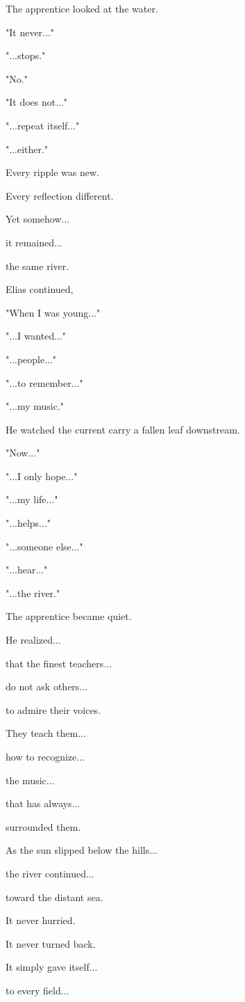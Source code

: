 \documentclass[12pt,openany]{book}
\begin{document}
The apprentice looked at the water.

"It never..."

"...stops."

"No."

"It does not..."

"...repeat itself..."

"...either."

Every ripple was new.

Every reflection different.

Yet somehow...

it remained...

the same river.

Elias continued,

"When I was young..."

"...I wanted..."

"...people..."

"...to remember..."

"...my music."

He watched the current carry a fallen leaf downstream.

"Now..."

"...I only hope..."

"...my life..."

"...helps..."

"...someone else..."

"...hear..."

"...the river."

The apprentice became quiet.

He realized...

that the finest teachers...

do not ask others...

to admire their voices.

They teach them...

how to recognize...

the music...

that has always...

surrounded them.

As the sun slipped below the hills...

the river continued...

toward the distant sea.

It never hurried.

It never turned back.

It simply gave itself...

to every field...
\end{document}
